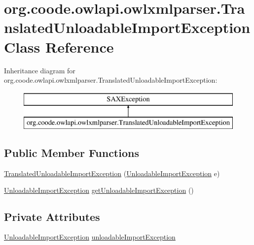\hypertarget{classorg_1_1coode_1_1owlapi_1_1owlxmlparser_1_1_translated_unloadable_import_exception}{\section{org.\-coode.\-owlapi.\-owlxmlparser.\-Translated\-Unloadable\-Import\-Exception Class Reference}
\label{classorg_1_1coode_1_1owlapi_1_1owlxmlparser_1_1_translated_unloadable_import_exception}
}
Inheritance diagram for org.\-coode.\-owlapi.\-owlxmlparser.\-Translated\-Unloadable\-Import\-Exception\-:\begin{figure}[H]
\begin{center}
\leavevmode
\includegraphics[height=2.000000cm]{classorg_1_1coode_1_1owlapi_1_1owlxmlparser_1_1_translated_unloadable_import_exception}
\end{center}
\end{figure}
\subsection*{Public Member Functions}
\begin{DoxyCompactItemize}
\item 
\hyperlink{classorg_1_1coode_1_1owlapi_1_1owlxmlparser_1_1_translated_unloadable_import_exception_a6c802b14408a56ef88f62715549d6174}{Translated\-Unloadable\-Import\-Exception} (\hyperlink{classorg_1_1semanticweb_1_1owlapi_1_1model_1_1_unloadable_import_exception}{Unloadable\-Import\-Exception} e)
\item 
\hyperlink{classorg_1_1semanticweb_1_1owlapi_1_1model_1_1_unloadable_import_exception}{Unloadable\-Import\-Exception} \hyperlink{classorg_1_1coode_1_1owlapi_1_1owlxmlparser_1_1_translated_unloadable_import_exception_a6166904b2d0c17ebd3749e7a3e003302}{get\-Unloadable\-Import\-Exception} ()
\end{DoxyCompactItemize}
\subsection*{Private Attributes}
\begin{DoxyCompactItemize}
\item 
\hyperlink{classorg_1_1semanticweb_1_1owlapi_1_1model_1_1_unloadable_import_exception}{Unloadable\-Import\-Exception} \hyperlink{classorg_1_1coode_1_1owlapi_1_1owlxmlparser_1_1_translated_unloadable_import_exception_a732f116c12f1aa3cf32251362c3904f4}{unloadable\-Import\-Exception}
\end{DoxyCompactItemize}
